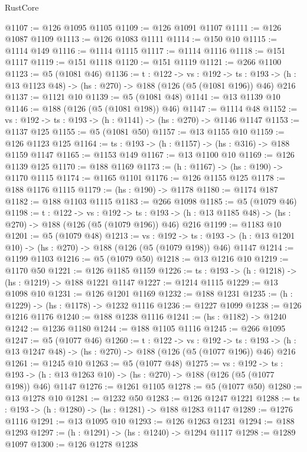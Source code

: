\begin{lexlean}{RustCore}
\begin{coremodule}
@1107 := @126 @1095 @1105
@1109 := @126 @1091 @1107
@1111 := @126 @1087 @1109
@1113 := @126 @1083 @1111
@1114 := @150 @10
@1115 := @1114 @149
@1116 := @1114 @1115
@1117 := @1114 @1116
@1118 := @151 @1117
@1119 := @151 @1118
@1120 := @151 @1119
@1121 := @266 @1100
@1123 := @5 (@1081 @46)
@1136 := {t : @122} ->
  {vs : @192} ->
  {ts : @193} -> (h : @13 @1123 @48) -> (hs : @270) -> @188 (@126 (@5 (@1081 @196)) @46) @216
@1137 := @1121 @10
@1139 := @5 (@1081 @48)
@1141 := @13 @1139 @10
@1146 := @188 (@126 (@5 (@1081 @198)) @46)
@1147 := @1114 @48
@1152 := {vs : @192} -> {ts : @193} -> (h : @1141) -> (hs : @270) -> @1146 @1147
@1153 := @1137 @125
@1155 := @5 (@1081 @50)
@1157 := @13 @1155 @10
@1159 := @126 @1123 @125
@1164 := {ts : @193} -> (h : @1157) -> (hs : @316) -> @188 @1159 @1147
@1165 := @1153 @149
@1167 := @13 @1100 @10
@1169 := @126 @1139 @125
@1170 := @188 @1169
@1173 := (h : @1167) -> (hs : @190) -> @1170 @1115
@1174 := @1165 @1101
@1176 := @126 @1155 @125
@1178 := @188 @1176 @1115
@1179 := (hs : @190) -> @1178
@1180 := @1174 @187
@1182 := @188 @1103 @1115
@1183 := @266 @1098
@1185 := @5 (@1079 @46)
@1198 := {t : @122} ->
  {vs : @192} ->
  {ts : @193} -> (h : @13 @1185 @48) -> (hs : @270) -> @188 (@126 (@5 (@1079 @196)) @46) @216
@1199 := @1183 @10
@1201 := @5 (@1079 @48)
@1213 := {vs : @192} ->
  {ts : @193} -> (h : @13 @1201 @10) -> (hs : @270) -> @188 (@126 (@5 (@1079 @198)) @46) @1147
@1214 := @1199 @1103
@1216 := @5 (@1079 @50)
@1218 := @13 @1216 @10
@1219 := @1170 @50
@1221 := @126 @1185 @1159
@1226 := {ts : @193} -> (h : @1218) -> (hs : @1219) -> @188 @1221 @1147
@1227 := @1214 @1115
@1229 := @13 @1098 @10
@1231 := @126 @1201 @1169
@1232 := @188 @1231
@1235 := (h : @1229) -> (hs : @1178) -> @1232 @1116
@1236 := @1227 @1099
@1238 := @126 @1216 @1176
@1240 := @188 @1238 @1116
@1241 := (hs : @1182) -> @1240
@1242 := @1236 @1180
@1244 := @188 @1105 @1116
@1245 := @266 @1095
@1247 := @5 (@1077 @46)
@1260 := {t : @122} ->
  {vs : @192} ->
  {ts : @193} -> (h : @13 @1247 @48) -> (hs : @270) -> @188 (@126 (@5 (@1077 @196)) @46) @216
@1261 := @1245 @10
@1263 := @5 (@1077 @48)
@1275 := {vs : @192} ->
  {ts : @193} -> (h : @13 @1263 @10) -> (hs : @270) -> @188 (@126 (@5 (@1077 @198)) @46) @1147
@1276 := @1261 @1105
@1278 := @5 (@1077 @50)
@1280 := @13 @1278 @10
@1281 := @1232 @50
@1283 := @126 @1247 @1221
@1288 := {ts : @193} -> (h : @1280) -> (hs : @1281) -> @188 @1283 @1147
@1289 := @1276 @1116
@1291 := @13 @1095 @10
@1293 := @126 @1263 @1231
@1294 := @188 @1293
@1297 := (h : @1291) -> (hs : @1240) -> @1294 @1117
@1298 := @1289 @1097
@1300 := @126 @1278 @1238

\end{coremodule}
\end{lexlean}
